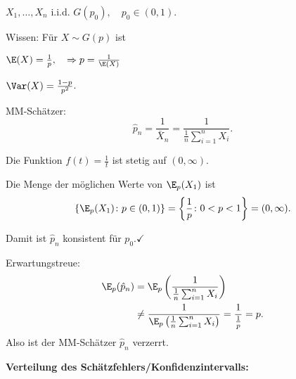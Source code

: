 \documentclass{tstextbook}
\begin{document}
\begin{example}
	$ X_1, \ldots, X_n $ i.i.d. $ G(p_0), \quad p_0 \in (0,1) $.
	
	Wissen: Für $ X \sim G(p) $ ist 
	
	$ \E(X) = \frac{1}{p}, \quad \Rightarrow p = \frac{1}{\E(X)} $
	
	$ \Var(X) = \frac{1-p}{p^2} $.
	
	MM-Schätzer: 
	\[
	\hat{p}_n = \frac{1}{\bar{X}_n} = \frac{1}{\frac{1}{n} \sum_{i=1}^{n} X_i}.
	\]
	
	Die Funktion $ f(t) = \frac{1}{t} $ ist stetig auf $ (0,\infty) $. 
	
	Die Menge der möglichen Werte von $ \E_p(X_1) $ ist \[ \left\lbrace \E_p (X_1) \colon p\in (0,1) \right\rbrace = \left\lbrace \frac{1}{p} \colon 0<p<1 \right\rbrace = (0, \infty). \]
	
	Damit ist $ \hat{p}_n $ konsistent für $ p_0 . \checkmark $
	
	Erwartungstreue: 
	\[
	\begin{aligned}
		\E_p(\hat{p}_n)  & = \E_p \left( \frac{1}{\frac{1}{n}\sum_{i=1}^{n}X_i} \right) \\
		& \ne \frac{1}{\E_p\left(\frac{1}{n}\sum_{i=1}^{n}X_i \right) } = \frac{1}{\frac{1}{p}} = p.
	\end{aligned}
	\]
	Also ist der MM-Schätzer $ \hat{p}_n $ verzerrt.
\end{example}

\textbf{Verteilung des Schätzfehlers/Konfidenzintervalls:}
\end{document}
